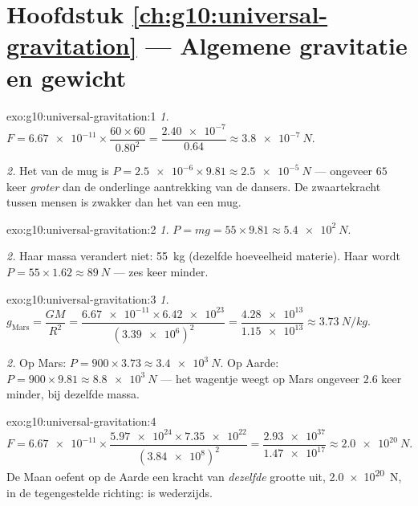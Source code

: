 \section*{Hoofdstuk \ref{ch:g10:universal-gravitation} --- Algemene gravitatie en gewicht}

\begin{solution}{exo:g10:universal-gravitation:1}
\emph{1.} $F = \num{6.67e-11} \times \dfrac{60 \times 60}{0.80^2}
= \dfrac{\num{2.40e-7}}{0.64} \approx \qty{3.8e-7}{N}$.

\emph{2.} Het  van de mug is
$P = \num{2.5e-6} \times 9.81 \approx \qty{2.5e-5}{N}$ --- ongeveer $65$
keer \emph{groter} dan de onderlinge aantrekking van de dansers. De
zwaartekracht tussen mensen is zwakker dan het  van een mug.
\end{solution}

\begin{solution}{exo:g10:universal-gravitation:2}
\emph{1.} $P = mg = 55 \times 9.81 \approx \qty{5.4e2}{N}$.

\emph{2.} Haar massa verandert niet: \qty{55}{kg} (dezelfde hoeveelheid
materie). Haar  wordt
$P = 55 \times 1.62 \approx \qty{89}{N}$ --- zes keer minder.
\end{solution}

\begin{solution}{exo:g10:universal-gravitation:3}
\emph{1.} $g_{\text{Mars}} = \dfrac{G M}{R^2}
= \dfrac{\num{6.67e-11} \times \num{6.42e23}}{(\num{3.39e6})^2}
= \dfrac{\num{4.28e13}}{\num{1.15e13}} \approx \qty{3.73}{N/kg}$.

\emph{2.} Op Mars: $P = 900 \times 3.73 \approx \qty{3.4e3}{N}$. Op
Aarde: $P = 900 \times 9.81 \approx \qty{8.8e3}{N}$ --- het wagentje
weegt op Mars ongeveer $2.6$ keer minder, bij dezelfde massa.
\end{solution}

\begin{solution}{exo:g10:universal-gravitation:4}
\[
F = \num{6.67e-11} \times
\frac{\num{5.97e24} \times \num{7.35e22}}{(\num{3.84e8})^2}
= \frac{\num{2.93e37}}{\num{1.47e17}}
\approx \qty{2.0e20}{N}.
\]
De Maan oefent op de Aarde een kracht van \emph{dezelfde} grootte uit,
\qty{2.0e20}{N}, in de tegengestelde richting:  is
wederzijds.
\end{solution}

